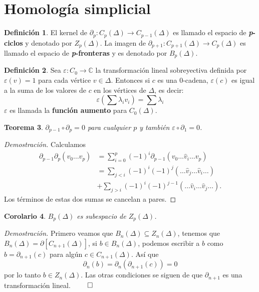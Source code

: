 \documentclass[12pt]{book}
\newtheorem{theorem}{Teorema}[section]
\newtheorem{corollary}[theorem]{Corolario}
\theoremstyle{definition}
\newtheorem{definition}[theorem]{Definición}
\newcounter{in}
\newcounter{ini}
\begin{document}
\section{Homología simplicial}

\begin{definition}
   El kernel de $\partial_{p}:C_{p}(\Delta)\rightarrow
   C_{p-1}(\Delta)$ es llamado el espacio de
   \textbf{\emph{p}-ciclos} y denotado por $Z_{p}(\Delta)$. La imagen
   de $\partial_{p+1}:C_{p+1}(\Delta)\rightarrow C_{p}(\Delta)$ es
   llamado el espacio de \textbf{\emph{p}-fronteras} y es denotado por $B_{p}(\Delta)$.
\end{definition}

\begin{definition}
  Sea $\varepsilon:C_{0}\rightarrow \mathbb{C}$ la transformación
  lineal sobreyectiva definida por $\varepsilon(v)=1$ para cada
  vértice $v\in \Delta$. Entonces si $c$ es una $0$-cadena,
  $\varepsilon(c)$ es igual a la suma de los valores de $c$ en los
  vértices de $\Delta$, es decir:
  $$\varepsilon(\sum \lambda_{i}v_{i})=\sum\lambda_{i}$$
  $\varepsilon$ es llamada la \textbf{función aumento} para
  $C_{0}(\Delta)$.
\end{definition}

\begin{theorem}
  $\partial_{p-1}\circ\partial_{p}=0$ para cualquier $p$ y también $\varepsilon\circ\partial_{1}=0$.
\end{theorem}

\begin{proof}[Demostración]
  Calculamos
  \begin{align*}
    \partial_{p-1}\partial_{p}(v_{0}\ldots
    v_{p})&=\sum_{i=0}^{p}(-1)^{i}\partial_{p-1}(v_{0}\ldots \widehat v_{i}\ldots v_{p})\\
    &=\sum_{j<i}(-1)^{i}(-1)^{j}(\ldots \widehat v_{j} \ldots \widehat v_{i} \ldots)\\
    &+\sum_{j>i}(-1)^{i}(-1)^{j-1}(\ldots\widehat v_{i}\ldots \widehat
    v_{j}\ldots).
  \end{align*}
  Los términos de estas dos sumas se cancelan a pares.
\end{proof}

\begin{corollary}
  $B_{p}(\Delta)$ es subespacio de $Z_{p}(\Delta)$.
\end{corollary}

\textit{Demostración.} Primero veamos que $B_{n}(\Delta)\subseteq Z_{n}(\Delta)$, tenemos que
$B_{n}(\Delta)=\partial[C_{n+1}(\Delta)]$, si $b\in B_{n}(\Delta)$,
podemos escribir a $b$ como $b=\partial_{n+1}(c)$ para algún $c\in
C_{n+1}(\Delta)$. Así que
$$\partial_{n}(b)=\partial_{n}(\partial_{n+1}(c))=0$$
por lo tanto $b\in Z_{n}(\Delta)$.
Las otras condiciones se siguen de que $\partial_{n+1}$ es una
transformación lineal. $\qed$
\end{document}
